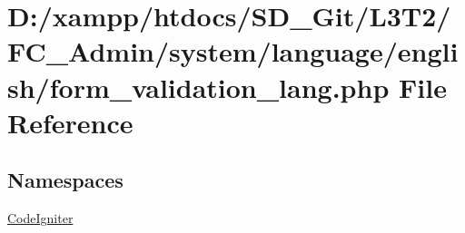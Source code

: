 \hypertarget{form__validation__lang_8php}{}\section{D\+:/xampp/htdocs/\+S\+D\+\_\+\+Git/\+L3\+T2/\+F\+C\+\_\+\+Admin/system/language/english/form\+\_\+validation\+\_\+lang.php File Reference}
\label{form__validation__lang_8php}
\subsection*{Namespaces}
\begin{DoxyCompactItemize}
\item 
 \hyperlink{namespace_code_igniter}{Code\+Igniter}
\end{DoxyCompactItemize}
